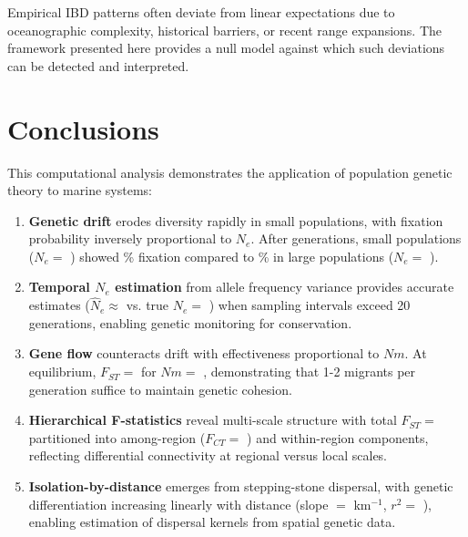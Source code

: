 \documentclass[11pt,a4paper]{article}
\begin{document}
Empirical IBD patterns often deviate from linear expectations due to oceanographic complexity, historical
barriers, or recent range expansions. The framework presented here provides a null model against which such
deviations can be detected and interpreted.

\section{Conclusions}

This computational analysis demonstrates the application of population genetic theory to marine systems:

\begin{enumerate}
\item \textbf{Genetic drift} erodes diversity rapidly in small populations, with fixation probability
inversely proportional to $N_e$. After  generations, small populations ($N_e = $ )
showed \% fixation compared to \% in large
populations ($N_e = $ ).

\item \textbf{Temporal $N_e$ estimation} from allele frequency variance provides accurate estimates
($\hat{N}_e \approx $  vs. true $N_e = $ ) when sampling
intervals exceed 20 generations, enabling genetic monitoring for conservation.

\item \textbf{Gene flow} counteracts drift with effectiveness proportional to $Nm$. At equilibrium,
$F_{ST} = $  for $Nm = $ ,
demonstrating that 1-2 migrants per generation suffice to maintain genetic cohesion.

\item \textbf{Hierarchical F-statistics} reveal multi-scale structure with total $F_{ST} = $
 partitioned into among-region ($F_{CT} = $ ) and within-region
components, reflecting differential connectivity at regional versus local scales.

\item \textbf{Isolation-by-distance} emerges from stepping-stone dispersal, with genetic differentiation
increasing linearly with distance (slope $= $  km$^{-1}$, $r^2 = $ ),
enabling estimation of dispersal kernels from spatial genetic data.
\end{enumerate}
\end{document}
